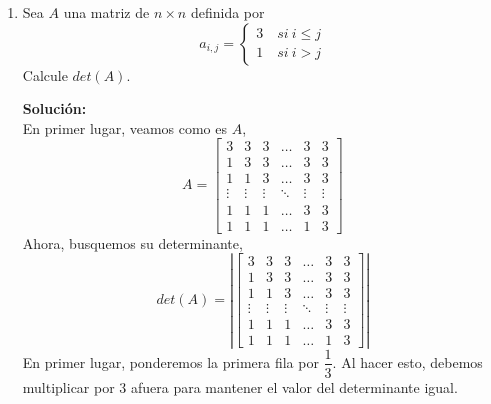 \documentclass[12pt]{article}
\newenvironment{solucion}
{\begin{mdframed}[backgroundcolor=black!10]
		{\bf Solución:}\\
	}
	{
	\end{mdframed}
}
\newenvironment{preguntas}
{\begin{enumerate}\itemsep12pt
	}
	{
	\end{enumerate}
}
\begin{document}
\begin{preguntas}
\begin{solucion}
\begin{enumerate}[a)]
\item Calcule  $det(5A)+det(3A^{-1})$ en terminos de $\alpha$.
			
			En primer lugar,
			$$det(5A) = 5^4det(a) = 5^4\alpha = 625 \alpha$$
			En segundo lugar,
			$$det(3A^{-1}) = 3^4det(A^{-1}) = 3^4 \dfrac{1}{\alpha} = \dfrac{81}{\alpha}$$
			Finalmente,
			$$det(5A)+det(3A^{-1}) = 625 \alpha + \dfrac{81}{\alpha}$$
\item Se sabe que $det(Adj(A))=8$. Calcule $\alpha$.
			
			Recordemos que
			$$A\ Adj(A) = det(A) I$$
			Apliquemos $det$ a ambos lados de la igualdad,
			$$det(A\ Adj(A)) = det(det(A) I)$$
			$$det(A)\ det(Adj(A)) = det(A)^4\ det(I)$$
			$$det(Adj(A)) = det(A)^3$$
			$$det(A) = \sqrt[3]{det(Adj(A))}$$
			$$det(A) = \sqrt[3]{8}$$
			$$det(A) = 2$$
\end{enumerate}
\end{solucion}
\item Sea $A$ una matriz de $n \times n$ definida por
	$$a_{i,j} = 
	\begin{cases}
	3 \quad si\ i\leq j \\
	1 \quad si\ i > j
	\end{cases}$$
	Calcule $det(A)$.
\begin{solucion}
En primer lugar, veamos como es $A$,
		$$A = \begin{bmatrix}
		3 & 3 & 3 & \dots & 3 & 3 \\ 
		1 & 3 & 3 & \dots & 3 & 3 \\ 
		1 & 1 & 3 & \dots & 3 & 3 \\ 
		\vdots & \vdots & \vdots & \ddots & \vdots & \vdots \\ 
		1 & 1 & 1 & \dots & 3 & 3 \\ 
		1 & 1 & 1 & \dots & 1 & 3
		\end{bmatrix}$$
		Ahora, busquemos su determinante,
		$$det(A) = \left|\begin{bmatrix}
		3 & 3 & 3 & \dots & 3 & 3 \\ 
		1 & 3 & 3 & \dots & 3 & 3 \\ 
		1 & 1 & 3 & \dots & 3 & 3 \\ 
		\vdots & \vdots & \vdots & \ddots & \vdots & \vdots \\ 
		1 & 1 & 1 & \dots & 3 & 3 \\ 
		1 & 1 & 1 & \dots & 1 & 3
		\end{bmatrix}\right|$$
		En primer lugar, ponderemos la primera fila por $\dfrac{1}{3}$. Al hacer esto, debemos multiplicar por 3 afuera para mantener el valor del determinante igual.

\end{solucion}
\end{preguntas}
\end{document}
